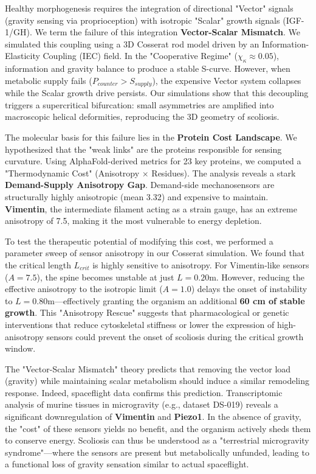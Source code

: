 \documentclass[11pt]{article}
\begin{document}
Healthy morphogenesis requires the integration of directional "Vector" signals (gravity sensing via proprioception) with isotropic "Scalar" growth signals (IGF-1/GH). We term the failure of this integration \textbf{Vector-Scalar Mismatch}. We simulated this coupling using a 3D Cosserat rod model driven by an Information-Elasticity Coupling (IEC) field. In the "Cooperative Regime" ($\chi_\kappa \approx 0.05$), information and gravity balance to produce a stable S-curve. However, when metabolic supply fails ($P_{counter} > S_{supply}$), the expensive Vector system collapses while the Scalar growth drive persists. Our simulations show that this decoupling triggers a supercritical bifurcation: small asymmetries are amplified into macroscopic helical deformities, reproducing the 3D geometry of scoliosis.

The molecular basis for this failure lies in the \textbf{Protein Cost Landscape}. We hypothesized that the "weak links" are the proteins responsible for sensing curvature. Using AlphaFold-derived metrics for 23 key proteins, we computed a "Thermodynamic Cost" (Anisotropy $\times$ Residues). The analysis reveals a stark \textbf{Demand-Supply Anisotropy Gap}. Demand-side mechanosensors are structurally highly anisotropic (mean 3.32) and expensive to maintain. \textbf{Vimentin}, the intermediate filament acting as a strain gauge\cite{wuest2025vim}, has an extreme anisotropy of 7.5, making it the most vulnerable to energy depletion.

To test the therapeutic potential of modifying this cost, we performed a parameter sweep of sensor anisotropy in our Cosserat simulation. We found that the critical length $L_{crit}$ is highly sensitive to anisotropy. For Vimentin-like sensors ($A=7.5$), the spine becomes unstable at just $L=0.20$m. However, reducing the effective anisotropy to the isotropic limit ($A=1.0$) delays the onset of instability to $L=0.80$m---effectively granting the organism an additional \textbf{60 cm of stable growth}. This "Anisotropy Rescue" suggests that pharmacological or genetic interventions that reduce cytoskeletal stiffness or lower the expression of high-anisotropy sensors could prevent the onset of scoliosis during the critical growth window.

The "Vector-Scalar Mismatch" theory predicts that removing the vector load (gravity) while maintaining scalar metabolism should induce a similar remodeling response. Indeed, spaceflight data confirms this prediction. Transcriptomic analysis of murine tissues in microgravity (e.g., dataset DS-019) reveals a significant downregulation of \textbf{Vimentin} and \textbf{Piezo1}\cite{rashidi2025piezo}. In the absence of gravity, the "cost" of these sensors yields no benefit, and the organism actively sheds them to conserve energy. Scoliosis can thus be understood as a "terrestrial microgravity syndrome"---where the sensors are present but metabolically unfunded, leading to a functional loss of gravity sensation similar to actual spaceflight.
\end{document}
